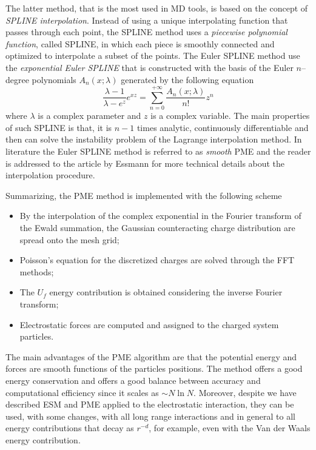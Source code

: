 The latter method, that is the most used in \ac{MD} tools, is based on the concept of \textit{SPLINE
interpolation}. Instead of using a unique interpolating function that passes through each point, the SPLINE
method uses a \textit{piecewise polynomial function}, called SPLINE, in which each piece is smoothly connected
and optimized to interpolate a subset of the points. The Euler SPLINE method use the \textit{exponential Euler
SPLINE} that is constructed with the basis of the Euler $n$--degree polynomials $A_n(x;\lambda)$ generated by the
following equation
\begin{equation*}
	\frac{\lambda - 1}{\lambda - e^z}e^{xz} = \sum_{n=0}^{+\infty} \frac{A_n(x;\lambda)}{n!}z^n
\end{equation*}
where $\lambda$ is a complex parameter and $z$ is a complex variable. The main properties of such SPLINE is that,
it is $n-1$ times analytic, continuously differentiable and then can solve the instability problem of the
Lagrange interpolation method. In literature the Euler SPLINE method is referred to as \textit{smooth} \ac{PME}
and the reader is addressed to the article by Essmann \etal{} \cite{EssmannSPME} for more technical details about
the interpolation procedure.

Summarizing, the \ac{PME} method is implemented with the following scheme
\begin{itemize}
	\item By the interpolation of the complex exponential in the Fourier transform of the Ewald summation, the
		  Gaussian counteracting charge distribution are spread onto the mesh grid;%
	\item Poisson's equation for the discretized charges are solved through the \ac{FFT} methods;
	\item The $U_f$ energy contribution is obtained considering the inverse Fourier transform;
	\item Electrostatic forces are computed and assigned to the charged system particles.
\end{itemize}

The main advantages of the \ac{PME} algorithm are that the potential energy and forces are smooth functions of
the particles positions. The method offers a good energy conservation and offers a good balance between accuracy
and computational efficiency since it scales as $\sim N\ln N$. Moreover, despite we have described \ac{ESM} and
\ac{PME} applied to the electrostatic interaction, they can be used, with some changes, with all long range
interactions and in general to all energy contributions that decay as $r^{-d}$, for example, even with the Van
der Waals energy contribution.

